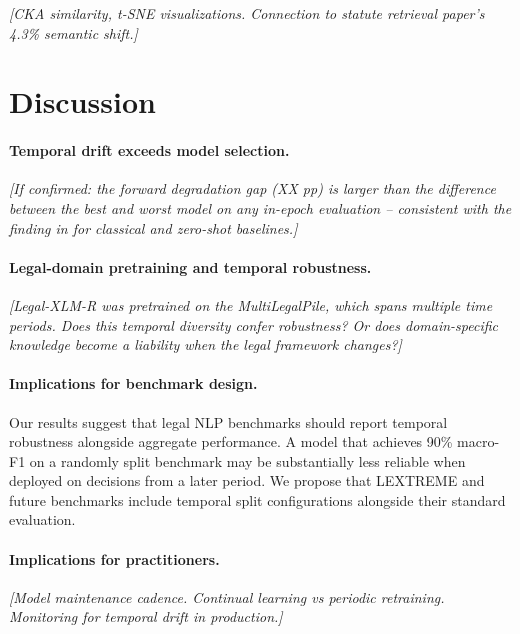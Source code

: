 \documentclass[11pt]{article}
\begin{document}
\textit{[CKA similarity, t-SNE visualizations. Connection to statute retrieval paper's 4.3\% semantic shift.]}

\section{Discussion}

\paragraph{Temporal drift exceeds model selection.}
\textit{[If confirmed: the forward degradation gap (XX pp) is larger than the difference between the best and worst model on any in-epoch evaluation -- consistent with the finding in \citet{ovcharov2025tokenizer} for classical and zero-shot baselines.]}

\paragraph{Legal-domain pretraining and temporal robustness.}
\textit{[Legal-XLM-R was pretrained on the MultiLegalPile, which spans multiple time periods. Does this temporal diversity confer robustness? Or does domain-specific knowledge become a liability when the legal framework changes?]}

\paragraph{Implications for benchmark design.}
Our results suggest that legal NLP benchmarks should report temporal robustness alongside aggregate performance. A model that achieves 90\% macro-F1 on a randomly split benchmark may be substantially less reliable when deployed on decisions from a later period. We propose that LEXTREME and future benchmarks include temporal split configurations alongside their standard evaluation.

\paragraph{Implications for practitioners.}
\textit{[Model maintenance cadence. Continual learning vs periodic retraining. Monitoring for temporal drift in production.]}

\end{document}
